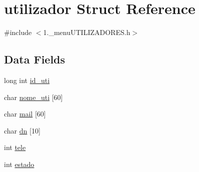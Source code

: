 \hypertarget{structutilizador}{\section{utilizador Struct Reference}
\label{structutilizador}
}


{\ttfamily \#include $<$1.\+\_\+menu\+U\+T\+I\+L\+I\+Z\+A\+D\+O\+R\+E\+S.\+h$>$}

\subsection*{Data Fields}
\begin{DoxyCompactItemize}
\item 
long int \hyperlink{structutilizador_ade1e35363a9e73ac0443d514809a2ed2}{id\+\_\+uti}
\item 
char \hyperlink{structutilizador_a9073385a3e289a31c348400685f9ec30}{nome\+\_\+uti} \mbox{[}60\mbox{]}
\item 
char \hyperlink{structutilizador_a02cac4787c82da8aa24aa640d9f9f4e8}{mail} \mbox{[}60\mbox{]}
\item 
char \hyperlink{structutilizador_aaee503890dbae4a98b7f7be5fd927cb0}{dn} \mbox{[}10\mbox{]}
\item 
int \hyperlink{structutilizador_ac061470c693046faeb6b26265dff592f}{tele}
\item 
int \hyperlink{structutilizador_a876d08c1d21086e4fd228744da10d028}{estado}
\end{DoxyCompactItemize}


